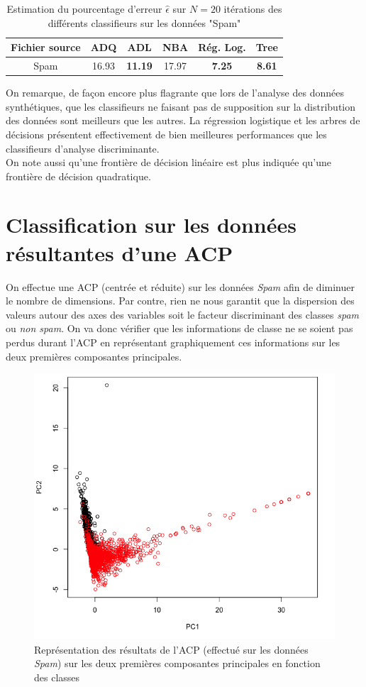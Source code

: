 \documentclass[a4paper,10pt]{report}
\begin{document}
\begin{table}[H]
	\centering
	\captionsetup{justification=centering, margin=4cm}
	\begin{tabular}{c|c|c|c|c|c}
		Fichier source & ADQ & ADL & NBA & Rég. Log. & Tree \\ 
		\hline
		Spam & 16.93 & \textbf{11.19} & 17.97 & \textbf{7.25} & \textbf{8.61}  \\ 
	\end{tabular}
	\caption{\small Estimation du pourcentage d'erreur $\hat{\epsilon}$ sur $N=20$ itérations des différents classifieurs sur les données "Spam"}
	\label{table:3-2-erreur-data-spam}
\end{table}


On remarque, de façon encore plus flagrante que lors de l'analyse des données synthétiques, que les classifieurs ne faisant pas de supposition sur la distribution des données sont meilleurs que les autres. La régression logistique et les arbres de décisions présentent effectivement de bien meilleures performances que les classifieurs d'analyse discriminante.\\
On note aussi qu'une frontière de décision linéaire est plus indiquée qu'une frontière de décision quadratique.



\section{Classification sur les données résultantes d'une ACP}

On effectue une ACP (centrée et réduite) sur les données \textit{Spam} afin de diminuer le nombre de dimensions. Par contre, rien ne nous garantit que la dispersion des valeurs autour des axes des variables soit le facteur discriminant des classes \textit{spam} ou \textit{non spam}. On va donc vérifier que les informations de classe ne se soient pas perdus durant l'ACP en représentant graphiquement ces informations sur les deux premières composantes principales.
\begin{figure}[H]
	\centering
	\captionsetup{justification=centering, margin=2cm}
	\includegraphics[width=.5\linewidth]{img/3-3-ACP-scale-center-spam-PC1-PC2}
	\caption{\small Représentation des résultats de l'ACP (effectué sur les données \textit{Spam}) sur les deux premières composantes principales en fonction des classes}
	\label{fig:ACP-scale-center-spam-PC1-PC2}%
\end{figure}
\end{document}
